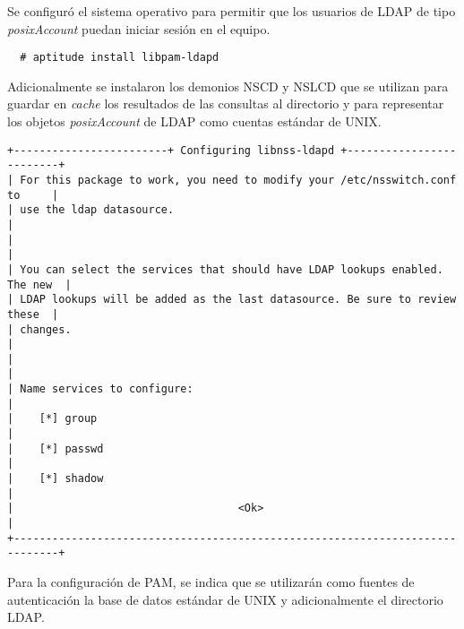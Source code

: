 Se configur\'{o} el sistema operativo para permitir que los usuarios de \textsc{LDAP} de tipo \textit{posixAccount} puedan iniciar sesi\'{o}n en el equipo.

{
\scriptsize
\linespread{1}
\begin{verbatim}
  # aptitude install libpam-ldapd
\end{verbatim}
}

Adicionalmente se instalaron los demonios \textsc{NSCD} y \textsc{NSLCD} que se utilizan para guardar en \textit{cache} los resultados de las consultas al directorio y para representar los objetos \textit{posixAccount} de \textsc{LDAP} como cuentas est\'{a}ndar de \textsc{UNIX}.

{
\scriptsize
\linespread{1}
\begin{verbatim}
+------------------------+ Configuring libnss-ldapd +-------------------------+
| For this package to work, you need to modify your /etc/nsswitch.conf to     |
| use the ldap datasource.                                                    |
|                                                                             |
| You can select the services that should have LDAP lookups enabled. The new  |
| LDAP lookups will be added as the last datasource. Be sure to review these  |
| changes.                                                                    |
|                                                                             |
| Name services to configure:                                                 |
|    [*] group                                                                |
|    [*] passwd                                                               |
|    [*] shadow                                                               |
|                                   <Ok>                                      |
+-----------------------------------------------------------------------------+
\end{verbatim}
}

Para la configuraci\'{o}n de \textsc{PAM}, se indica que se utilizar\'{a}n como fuentes de autenticaci\'{o}n la base de datos est\'{a}ndar de UNIX y adicionalmente el directorio LDAP.

